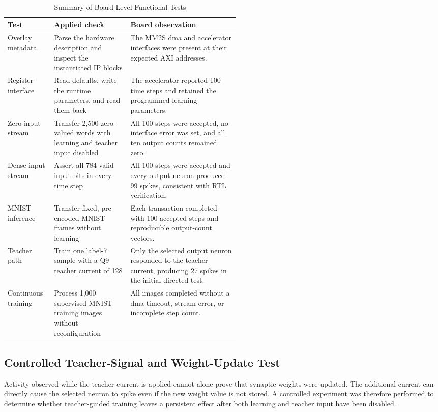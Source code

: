 \begin{table}[htbp]
	\centering
	\caption{Summary of Board-Level Functional Tests}
	\label{tab:board-functional-tests}
	\small
	\begin{tabularx}{\linewidth}{@{}p{0.20\linewidth}p{0.33\linewidth}X@{}}
		\toprule
		\textbf{Test} & \textbf{Applied check} & \textbf{Board observation} \\
		\midrule
		Overlay metadata & Parse the hardware description and inspect the instantiated IP blocks & The MM2S \gls{dma} and accelerator interfaces were present at their expected AXI addresses. \\
		Register interface & Read defaults, write the runtime parameters, and read them back & The accelerator reported 100 time steps and retained the programmed learning parameters. \\
		Zero-input stream & Transfer 2,500 zero-valued words with learning and teacher input disabled & All 100 steps were accepted, no interface error was set, and all ten output counts remained zero. \\
		Dense-input stream & Assert all 784 valid input bits in every time step & All 100 steps were accepted and every output neuron produced 99 spikes, consistent with RTL verification. \\
		MNIST inference & Transfer fixed, pre-encoded MNIST frames without learning & Each transaction completed with 100 accepted steps and reproducible output-count vectors. \\
		Teacher path & Train one label-7 sample with a Q9 teacher current of 128 & Only the selected output neuron responded to the teacher current, producing 27 spikes in the initial directed test. \\
		Continuous training & Process 1,000 supervised MNIST training images without reconfiguration & All images completed without a \gls{dma} timeout, stream error, or incomplete step count. \\
		\bottomrule
	\end{tabularx}
\end{table}

\subsection{Controlled Teacher-Signal and Weight-Update Test}

Activity observed while the teacher current is applied cannot alone prove that synaptic weights were updated. The additional current can directly cause the selected neuron to spike even if the new weight value is not stored. A controlled experiment was therefore performed to determine whether teacher-guided training leaves a persistent effect after both learning and teacher input have been disabled.

